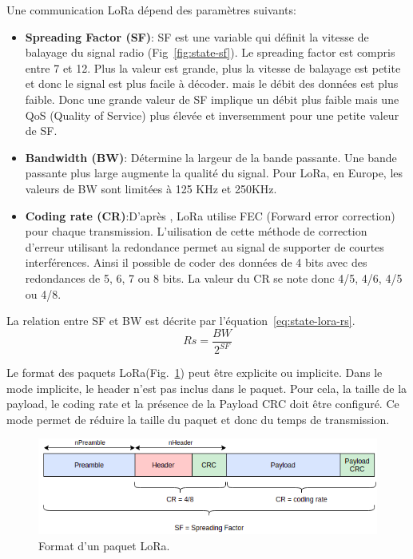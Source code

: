 Une communication LoRa dépend des paramètres suivants:
\begin{itemize}
    \item \textbf{Spreading Factor (SF)}: SF est une variable qui définit la vitesse de balayage du signal radio (Fig~\ref{fig:state-sf}). Le spreading factor est compris entre 7 et 12. Plus la valeur est grande, plus la vitesse de balayage est petite et donc le signal est plus facile à décoder. mais le débit des données est plus faible. Donc une grande valeur de SF implique un débit plus faible mais une QoS (Quality of Service) plus élevée et inversemment pour une petite valeur de SF.
    \item \textbf{Bandwidth (BW)}: Détermine la largeur de la bande passante. Une bande passante plus large augmente la qualité du signal. Pour LoRa, en Europe, les valeurs de BW sont limitées à 125 KHz et 250KHz.
    \item \textbf{Coding rate (CR)}:D'après , LoRa utilise FEC (Forward error correction) pour chaque transmission. L'uilisation de cette méthode de correction d'erreur utilisant la redondance permet au signal de supporter de courtes interférences. Ainsi il possible de coder des données de 4 bits avec des redondances de 5, 6, 7 ou 8 bits. La valeur du CR se note donc 
    4/5, 4/6, 4/5 ou 4/8.
\end{itemize}

La relation entre SF et BW est décrite par l'équation~\ref{eq:state-lora-rs}.
\begin{equation}\label{eq:state-lora-rs}
    Rs = \frac{BW}{2^{SF}}
\end{equation}

\vspace{1cm}
Le format des paquets LoRa(Fig.~\ref{fig:state-lora-frame-format}) peut être explicite ou implicite.
Dans le mode implicite, le header n'est pas inclus dans le paquet. Pour cela, la taille de la payload, le coding rate et la présence de la Payload CRC doit être configuré.
Ce mode permet de réduire la taille du paquet et donc du temps de transmission.

\begin{figure}[H]
    \centering
    \includegraphics[scale=0.6]{res/pictures/lora-frame-format.drawio.png}
    \caption{Format d'un paquet LoRa.}
    \label{fig:state-lora-frame-format}
\end{figure}

